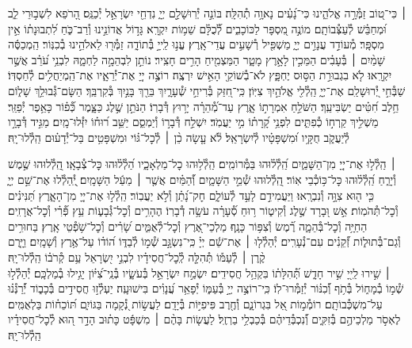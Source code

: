 \documentclass[twoside, openany, parskip=half, 11pt]{book}
\begin{document}
 ׀
כִּי־ט֭וֹב זַמְּ֯רָ֣ה אֱלֹהֵ֑ינוּ כִּי־נָ֝עִ֗ים נָאוָ֥ה תְ֯הִלָּֽה׃
בּוֹנֵ֣ה יְ֯רֽוּשָׁלַ֣‍ִם יְיָ֑ נִדְחֵ֖י יִשְׂרָאֵ֣ל יְ֯כַנֵּֽס׃
הָ֭רֹפֵא לִשְׁב֣וּרֵי לֵ֑ב וּ֝מְחַבֵּ֗שׁ לְ֯עַצְּ֯בוֹתָֽם׃
מוֹנֶ֣ה מִ֭סְפָּר לַכּוֹכָבִ֑ים לְ֯֝כֻלָּ֗ם שֵׁמ֥וֹת יִקְרָֽא׃
גָּד֣וֹל אֲדוֹנֵ֣ינוּ וְ֯רַב־כֹּ֑חַ לִ֝תְבוּנָת֗וֹ אֵ֣ין מִסְפָּֽר׃
מְ֯עוֹדֵ֣ד עֲנָוִ֣ים יְיָ֑ מַשְׁפִּ֖יל רְ֯שָׁעִ֣ים עֲדֵי־אָֽרֶץ׃
עֱנ֣וּ לַֽייָ֣ בְּ֯תוֹדָ֑ה זַמְּ֯ר֖וּ לֵאלֹהֵ֣ינוּ בְ֯כִנּֽוֹר׃
הַֽמְכַסֶּ֬ה שָׁמַ֨יִם ׀ בְּ֯עָבִ֗ים הַמֵּכִ֣ין לָאָ֣רֶץ מָטָ֑ר הַמַּצְמִ֖יחַ הָרִ֣ים חָצִֽיר׃
נוֹתֵ֣ן לִבְהֵמָ֣ה לַחְמָ֑הּ לִבְנֵ֥י עֹ֝רֵ֗ב אֲשֶׁ֣ר יִקְרָֽאוּ׃
לֹ֤א בִגְבוּרַ֣ת הַסּ֣וּס יֶחְפָּ֑ץ לֹא־בְ֯שׁוֹקֵ֖י הָאִ֣ישׁ יִרְצֶֽה׃
רוֹצֶ֣ה יְיָ֭ אֶת־יְ֯רֵאָ֑יו אֶת־הַֽמְיַחֲלִ֥ים לְ֯חַסְדּֽוֹ׃
שַׁבְּ֯חִ֣י יְ֭֯רוּשָׁלַ‍ִם אֶת־יְיָ֑ הַֽלְ֯לִ֖י אֱלֹהַ֣יִךְ צִיּֽוֹן׃
כִּֽי־חִ֭זַּק בְּ֯רִיחֵ֣י שְׁ֯עָרָ֑יִךְ בֵּרַ֖ךְ בָּנַ֣יִךְ בְּ֯קִרְבֵּֽךְ׃
הַשָּׂם־גְּ֯בוּלֵ֥ךְ שָׁל֑וֹם חֵ֥לֶב חִ֝טִּ֗ים יַשְׂבִּיעֵֽךְ׃
הַשֹּׁלֵ֣חַ אִמְרָת֣וֹ אָ֑רֶץ עַד־מְ֯֝הֵרָ֗ה יָר֥וּץ דְּ֯בָרֽוֹ׃
הַנֹּתֵ֣ן שֶׁ֣לֶג כַּצָּ֑מֶר כְּ֯֝פ֗וֹר כָּאֵ֥פֶר יְ֯פַזֵּֽר׃
מַשְׁלִ֣יךְ קַֽרְח֣וֹ כְ֯פִתִּ֑ים לִפְנֵ֥י קָ֝רָת֗וֹ מִ֣י יַעֲמֹֽד׃
יִשְׁלַ֣ח דְּ֯בָר֣וֹ וְ֯יַמְסֵ֑ם יַשֵּׁ֥ב ר֝וּח֗וֹ יִזְּ֯לוּ־מָֽיִם׃
מַגִּ֣יד דְּ֯בָרָ֣ו לְ֯יַעֲקֹ֑ב חֻקָּ֥יו וּ֝מִשְׁפָּטָ֗יו לְ֯יִשְׂרָאֵֽל׃
לֹ֘א עָ֤שָׂה כֵ֨ן ׀ לְ֯כׇל־גּ֗וֹי וּמִשְׁפָּטִ֥ים בַּל־יְ֯דָע֗וּם הַֽלְ֯לוּ־יָֽהּ׃


 ׀
הַֽלְ֯ל֣וּ אֶת־יְיָ֭ מִן־הַשָּׁמַ֑יִם הַֽ֝לְ֯ל֗וּהוּ בַּמְּ֯רוֹמִֽים׃
הַֽלְ֯ל֥וּהוּ כׇל־מַלְאָכָ֑יו הַ֝לְ֯ל֗וּהוּ כׇּל־צְ֯בָאָֽו׃
הַֽ֭לְ֯לוּהוּ שֶׁ֣מֶשׁ וְ֯יָרֵ֑חַ הַֽ֝לְ֯ל֗וּהוּ כׇּל־כּ֥וֹכְ֯בֵי אֽוֹר׃
הַֽ֭לְ֯לוּהוּ שְׁ֯מֵ֣י הַשָּׁמָ֑יִם וְ֯֝הַמַּ֗יִם אֲשֶׁ֤ר ׀ מֵעַ֬ל הַשָּׁמָֽיִם׃
יְֽ֭֯הַלְ֯לוּ אֶת־שֵׁ֣ם יְיָ֑ כִּ֤י ה֖וּא צִוָּ֣ה וְ֯נִבְרָֽאוּ׃
וַיַּעֲמִידֵ֣ם לָעַ֣ד לְ֯עוֹלָ֑ם חׇק־נָ֝תַ֗ן וְ֯לֹ֣א יַעֲבֽוֹר׃
הַֽלְ֯ל֣וּ אֶת־יְיָ֭ מִן־הָאָ֑רֶץ תַּ֝נִּינִ֗ים וְ֯כׇל־תְּ֯הֹמֽוֹת׃
אֵ֣שׁ וּ֭בָרָד שֶׁ֣לֶג וְ֯קִיט֑וֹר ר֥וּחַ סְ֯֝עָרָ֗ה עֹשָׂ֥ה דְ֯בָרֽוֹ׃
הֶהָרִ֥ים וְ֯כׇל־גְּ֯בָע֑וֹת עֵ֥ץ פְּ֯֝רִ֗י וְ֯כׇל־אֲרָזִֽים׃
הַחַיָּ֥ה וְ֯כׇל־בְּ֯הֵמָ֑ה רֶ֗֝מֶשׂ וְ֯צִפּ֥וֹר כָּנָֽף׃
מַלְכֵי־אֶ֭רֶץ וְ֯כׇל־לְ֯אֻמִּ֑ים שָׂ֝רִ֗ים וְ֯כׇל־שֹׁ֥פְ֯טֵי אָֽרֶץ׃
בַּחוּרִ֥ים וְ֯גַם־בְּ֯תוּל֑וֹת זְ֯֝קֵנִ֗ים עִם־נְ֯עָרִֽים׃
יְ֯הַלְ֯ל֤וּ ׀ אֶת־שֵׁ֬ם יְיָ֗ כִּֽי־נִשְׂגָּ֣ב שְׁ֯מ֣וֹ לְ֯בַדּ֑וֹ
ה֝וֹד֗וֹ עַל־אֶ֥רֶץ וְ֯שָׁמָֽיִם׃ וַיָּ֤רֶם קֶ֨רֶן ׀ לְ֯עַמּ֡וֹ תְּ֯הִלָּ֤ה לְֽ֯כׇל־חֲסִידָ֗יו
לִבְנֵ֣י יִ֭שְׂרָאֵל עַ֥ם קְ֯רֹב֗וֹ הַֽלְ֯לוּ־יָֽהּ׃\\
 ׀
שִׁ֣ירוּ לַֽייָ֭ שִׁ֣יר חָדָ֑שׁ תְּ֯֝הִלָּת֗וֹ בִּקְהַ֥ל חֲסִידִֽים׃
יִשְׂמַ֣ח יִשְׂרָאֵ֣ל בְּ֯עֹשָׂ֑יו בְּ֯נֵֽי־צִ֝יּ֗וֹן יָגִ֥ילוּ בְ֯מַלְכָּֽם׃
יְ֯הַלְ֯ל֣וּ שְׁ֯מ֣וֹ בְ֯מָח֑וֹל בְּ֯תֹ֥ף וְ֯֝כִנּ֗וֹר יְ֯זַמְּ֯רוּ־לֽוֹ׃
כִּֽי־רוֹצֶ֣ה יְיָ֣ בְּ֯עַמּ֑וֹ יְ֯פָאֵ֥ר עֲ֝נָוִ֗ים בִּישׁוּעָֽה׃
יַעְלְ֯ז֣וּ חֲסִידִ֣ים בְּ֯כָב֑וֹד יְ֯֝רַנְּ֯נ֗וּ עַל־מִשְׁכְּ֯בוֹתָֽם׃
רוֹמְ֯מ֣וֹת אֵ֭ל בִּגְרוֹנָ֑ם וְ֯חֶ֖רֶב פִּיפִיּ֣וֹת בְּ֯יָדָֽם׃
לַעֲשׂ֣וֹת נְ֭֯קָמָה בַּגּוֹיִ֑ם תּ֝וֹכֵח֗וֹת בַּלְאֻמִּֽים׃
לֶאְסֹ֣ר מַלְכֵיהֶ֣ם בְּ֯זִקִּ֑ים וְ֯֝נִכְבְּ֯דֵיהֶ֗ם בְּ֯כַבְלֵ֥י בַרְזֶֽל׃
לַעֲשׂ֤וֹת בָּהֶ֨ם ׀ מִשְׁפָּ֬ט כָּת֗וּב הָדָ֣ר ה֭וּא לְ֯כׇל־חֲסִידָ֗יו הַֽלְ֯לוּ־יָֽהּ׃
\end{document}
